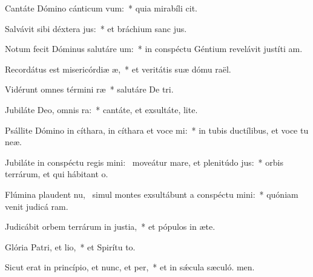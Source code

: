 \item Cantáte Dómino cánticum vum:~* quia mirabíli cit.
\item Salvávit sibi déxtera jus:~* et bráchium sanc jus.
\item Notum fecit Dóminus salutáre um:~* in conspéctu Géntium revelávit justíti am.
\item Recordátus est misericórdiæ æ,~* et veritátis suæ dómu raël.
\item Vidérunt omnes términi ræ~* salutáre De tri.
\item Jubiláte Deo, omnis ra:~* cantáte, et exsultáte,  lite.
\item Psállite Dómino in cíthara, in cíthara et voce mi:~* in tubis ductílibus, et voce tu neæ.
\item Jubiláte in conspéctu regis mini:~\pscross{} moveátur mare, et plenitúdo jus:~* orbis terrárum, et qui hábitant  o.
\item Flúmina plaudent nu,~\pscross{} simul montes exsultábunt a conspéctu mini:~* quóniam venit judicá ram.
\item Judicábit orbem terrárum in justia,~* et pópulos in æte.
\item Glória Patri, et lio,~* et Spirítu to.
\item Sicut erat in princípio, et nunc, et per,~* et in sǽcula sæculó. men.
